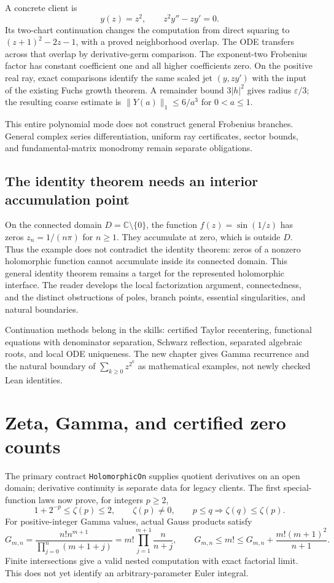 A concrete client is
\[
 y(z)=z^2,\qquad z^2y''-zy'=0.
\]
Its two-chart continuation changes the computation from direct squaring to
$(z+1)^2-2z-1$, with a proved neighborhood overlap. The ODE transfers across
that overlap by derivative-germ comparison. The exponent-two Frobenius
factor has constant coefficient one and all higher coefficients zero.
On the positive real ray, exact comparisons identify the same scaled jet
$(y,zy')$ with the input of the existing Fuchs growth theorem. A remainder
bound $3|h|^2$ gives radius $\varepsilon/3$; the resulting coarse estimate is
$\lVert Y(a)\rVert_1\le6/a^3$ for $0<a\le1$.

This entire polynomial mode does not construct general Frobenius branches.
General complex series differentiation, uniform ray certificates, sector
bounds, and fundamental-matrix monodromy remain separate obligations.

\subsection{The identity theorem needs an interior accumulation point}
On the connected domain $D=\mathbb C\setminus\{0\}$, the function
$f(z)=\sin(1/z)$ has zeros $z_n=1/(n\pi)$ for $n\ge1$. They accumulate
at zero, which is outside $D$. Thus the example does not contradict the
identity theorem: zeros of a nonzero holomorphic function cannot accumulate
inside its connected domain. This general identity theorem remains a target
for the represented holomorphic interface. The reader develops the local
factorization argument, connectedness, and the distinct obstructions of
poles, branch points, essential singularities, and natural boundaries.

Continuation methods belong in the skills: certified Taylor recentering,
functional equations with denominator separation, Schwarz reflection,
separated algebraic roots, and local ODE uniqueness. The new chapter gives
Gamma recurrence and the natural boundary of $\sum_{k\ge0}z^{2^k}$ as
mathematical examples, not newly checked Lean identities.


\section{Zeta, Gamma, and certified zero counts}
The primary contract \texttt{HolomorphicOn} supplies quotient derivatives on an
open domain; derivative continuity is separate data for legacy clients.
The first special-function laws now prove, for integers \(p\ge2\),
\[
 1+2^{-p}\le\zeta(p)\le2,\qquad\zeta(p)\ne0,
 \qquad p\le q\Longrightarrow\zeta(q)\le\zeta(p).
\]
For positive-integer Gamma values, actual Gauss products satisfy
\[
 G_{m,n}=\frac{n!n^{m+1}}{\prod_{j=0}^{n}(m+1+j)}
 =m!\prod_{j=1}^{m+1}\frac{n}{n+j},\qquad
 G_{m,n}\le m!\le G_{m,n}+\frac{m!(m+1)^2}{n+1}.
\]
Finite intersections give a valid nested computation with exact factorial
limit. This does not yet identify an arbitrary-parameter Euler integral.

